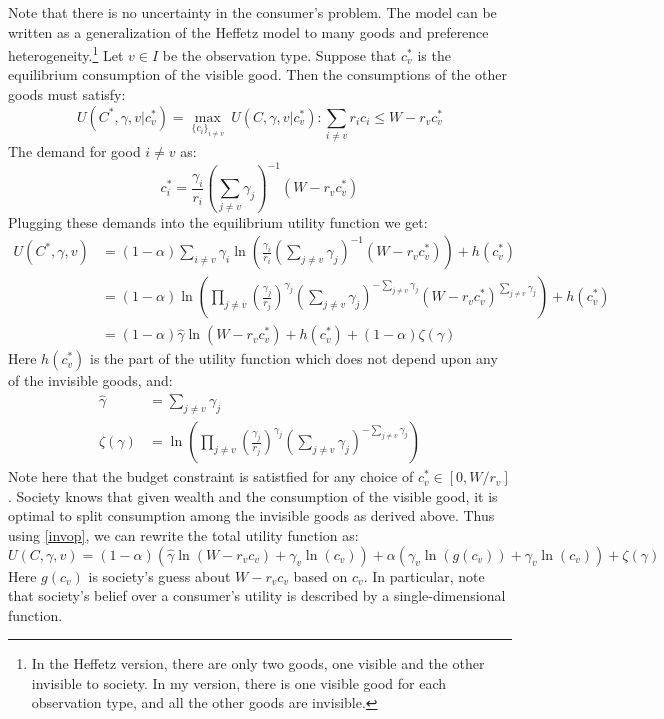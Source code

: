 \documentclass{article}
\begin{document}
Note that there is no uncertainty in the consumer's problem.
The model can be written as a generalization of the Heffetz model to many goods and preference heterogeneity.\footnote{ In the Heffetz version, there are only two goods, one visible and the other invisible to society. In my version, there is one visible good for each observation type, and all the other goods are invisible.}
Let $v\in I$ be the observation type.
Suppose that $c_v^*$ is the equilibrium consumption of the visible good.
Then the consumptions of the other goods must satisfy:
\[ U(C^*,\gamma,v|c_v^*)=\underset{\{c_i\}_{i\neq v}}{\max} \ U(C,\gamma,v|c_v^*) :  \sum_{i \neq v} r_i c_i \le W-r_v c_v^*\]
The demand for good $i\neq v$ as:
\[ c_i^* = \frac{\gamma_i}{r_i}\left(\sum_{j\neq v} \gamma_j\right)^{-1}\left(W-r_v c_v^* \right)\]
Plugging these demands into the equilibrium utility function we get:
\begin{align}
	U(C^*,\gamma,v) &= (1-\alpha)\sum_{i\neq v} \gamma_i \ln\left(\frac{\gamma_i}{r_i}\left(\sum_{j\neq v} \gamma_j\right)^{-1}\left(W-r_v c_v^* \right)\right) + h(c_v^*) \nonumber \\ 
	&= (1-\alpha) \ln\left(\prod_{j\neq v} \left(\frac{\gamma_j}{r_j}\right)^{\gamma_j}\left(\sum_{j\neq v} \gamma_j\right)^{-\sum_{j\neq v} \gamma_j}\left(W-r_v c_v^* \right)^{\sum_{j\neq v} \gamma_j}\right) + h(c_v^*) \nonumber \\ 
	\label{invop}
	&= (1-\alpha) \hat{\gamma} \ln \left(W-r_v c_v^*\right) + h(c_v^*) + (1-\alpha) \zeta(\gamma) 
\end{align}
Here $h(c_v^*)$ is the part of the utility function which does not depend upon any of the invisible goods, and:
\begin{align*}
	\hat{\gamma} &= \sum_{j\neq v} \gamma_j\\
	\zeta(\gamma) & = \ln\left(\prod_{j\neq v} \left(\frac{\gamma_j}{r_j}\right)^{\gamma_j}\left(\sum_{j\neq v} \gamma_j\right)^{-\sum_{j\neq v} \gamma_j}\right) 
\end{align*}
Note here that the budget constraint is satistfied for any choice of $c_v^* \in [0,W/r_v]$.
Society knows that given wealth and the consumption of the visible good, it is optimal to split consumption among the invisible goods as derived above.  Thus using \eqref{invop}, we can rewrite the total utility function as: 
\begin{equation}
	\label{ufun}
	U(C,\gamma,v) = (1-\alpha) \left(\hat{\gamma} \ln \left(W-r_v c_v\right) + \gamma_v \ln \left(c_v \right)\right) + \alpha \left(\gamma_v \ln \left(g(c_v)\right) + \gamma_v \ln \left(c_v\right) \right) + \zeta(\gamma)
	 \end{equation}
Here $g(c_v)$ is society's guess about $W-r_v c_v$ based on $c_v$. 
In particular, note that society's belief over a consumer's utility is described by a single-dimensional function.
\end{document}

